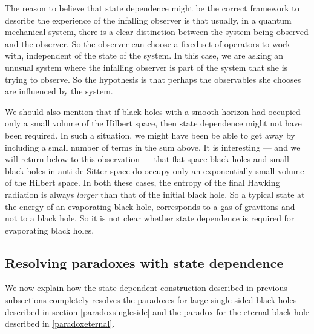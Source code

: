 \documentclass[12pt]{article}
\begin{document}
The reason to believe that state dependence might be the correct framework to describe the experience of the infalling observer is that  usually, in a quantum mechanical system, there is a clear distinction between the system being observed and the observer. So the observer can choose a fixed set of operators to work with, independent of the state of the system. In this case, we are asking an unusual system where the infalling observer is part of the system that she is trying to observe. So the hypothesis is that perhaps the observables she chooses are influenced by the system.



We should also mention that if black holes with a smooth horizon had occupied only a small volume of the Hilbert space, then state dependence might not have been required. In such a situation, we might have been be able to get away by including a small number of terms in the sum above.   It is interesting --- and we will return below to this observation --- that  flat space black holes  and small black holes in anti-de Sitter space do occupy only an exponentially small volume of the Hilbert space. In both these cases, the entropy of the final Hawking radiation is always {\em larger} than that of the initial black hole. So a typical state at the energy of an evaporating black hole,  corresponds to  a gas of gravitons and not to a black hole.  So it is not clear whether state dependence is required for evaporating black holes.









\subsection{Resolving paradoxes with state dependence \label{secresolvestatedep}}
We now explain how the state-dependent construction described in previous subsections completely resolves the paradoxes for large single-sided black holes described in section \ref{paradoxsingleside} and
the paradox for the eternal black hole described in \ref{paradoxeternal}.
\end{document}
